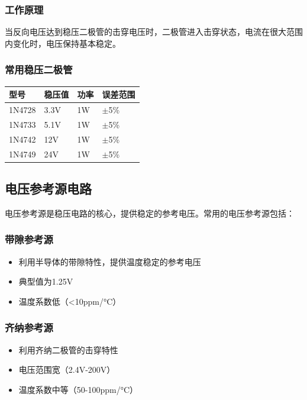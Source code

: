\documentclass[12pt,UTF8]{ctexbook}
\begin{document}
\subsubsection{工作原理}

当反向电压达到稳压二极管的击穿电压时，二极管进入击穿状态，电流在很大范围内变化时，电压保持基本稳定。

\subsubsection{常用稳压二极管}

\begin{tabular}{|l|l|l|l|}
\hline
型号 & 稳压值 & 功率 & 误差范围 \\
\hline
1N4728 & 3.3V & 1W & $\pm$5\% \\
\hline
1N4733 & 5.1V & 1W & $\pm$5\% \\
\hline
1N4742 & 12V & 1W & $\pm$5\% \\
\hline
1N4749 & 24V & 1W & $\pm$5\% \\
\hline
\end{tabular}

\subsection{电压参考源电路}

电压参考源是稳压电路的核心，提供稳定的参考电压。常用的电压参考源包括：

\subsubsection{带隙参考源}
\begin{itemize}
    \item 利用半导体的带隙特性，提供温度稳定的参考电压
    \item 典型值为1.25V
    \item 温度系数低（<10ppm/°C）
\end{itemize}

\subsubsection{齐纳参考源}
\begin{itemize}
    \item 利用齐纳二极管的击穿特性
    \item 电压范围宽（2.4V-200V）
    \item 温度系数中等（50-100ppm/°C）
\end{itemize}
\end{document}
